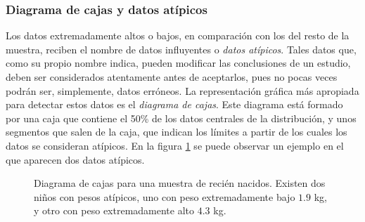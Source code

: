 \subsubsection{Diagrama de cajas y datos atípicos}
Los datos extremadamente altos o bajos, en comparación con los del resto de la muestra, reciben el nombre de datos
influyentes o \emph{datos atípicos}. Tales datos que, como su propio nombre indica, pueden modificar las conclusiones de
un estudio, deben ser considerados atentamente antes de aceptarlos, pues no pocas veces podrán ser, simplemente, datos
erróneos. La representación gráfica más apropiada para detectar estos datos es el \emph{diagrama de cajas}. Este
diagrama está formado por una caja que contiene el 50\% de los datos centrales de la distribución, y unos segmentos que
salen de la caja, que indican los límites a partir de los cuales los datos se consideran atípicos. En la figura
\ref{g:cajas} se puede observar un ejemplo en el que aparecen dos datos atípicos.

\begin{figure}[h!]
\begin{center}
\scalebox{0.8}{}
\caption{Diagrama de cajas para una muestra de recién nacidos.
Existen dos niños con pesos atípicos, uno con peso extremadamente
bajo $1.9$ kg, y otro con peso extremadamente alto $4.3$ kg.}
\label{g:cajas}
\end{center}
\end{figure}

\clearpage
\newpage

